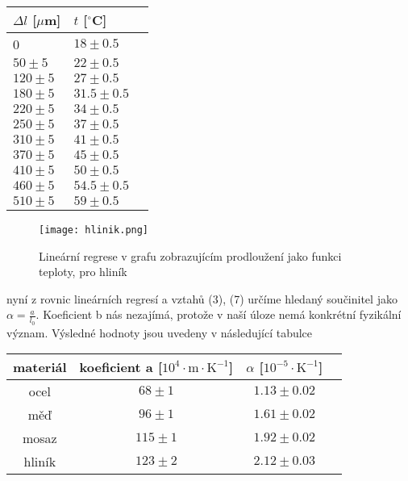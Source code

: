 \documentclass{article}
\begin{document}
\begin{center}
    \label{tab:title}
    \begin{tabular}{ | l | l  | p{4cm} |} \hline
    $\Delta l$ [$\mu$m] & $t$ [$^\circ$C] \\ \hline
    0 & $18\pm0.5$ \\ \hline
    $50\pm5$ & $22\pm0.5$ \\ \hline
    $120\pm5$ & $27\pm0.5$ \\ \hline
    $180\pm5$ & $31.5\pm0.5$ \\ \hline
    $220\pm5$ & $34\pm0.5$ \\ \hline
    $250\pm5$ & $37\pm0.5$ \\ \hline
    $310\pm5$ & $41\pm0.5$ \\ \hline
    $370\pm5$ & $45\pm0.5$ \\ \hline
    $410\pm5$ & $50\pm0.5$ \\ \hline
    $460\pm5$ & $54.5\pm0.5$ \\ \hline
    $510\pm5$ & $59\pm0.5$ \\ \hline
    \end{tabular}
\end{center}
\begin{figure}[H]
\centering
\texttt{[image: hlinik.png]}
\caption{Lineární regrese v grafu zobrazujícím prodloužení jako funkci teploty, pro hliník}
\end{figure}
nyní z rovnic lineárních regresí a vztahů (3), (7) určíme hledaný součinitel jako $\alpha = \frac{a}{l_{0}}$. Koeficient b nás nezajímá, protože v naší úloze nemá konkrétní fyzikální význam. Výsledné hodnoty jsou uvedeny v následující tabulce
\begin{center}
    \label{tab:title}
    \begin{tabular}{ | c | c | c  | m{4cm} |} \hline
    materiál & koeficient a [$\mathrm{10^{4} \cdot m \cdot K^{-1}}$] & $\alpha$ [$\mathrm{10^{-5} \cdot K^{-1}}$] \\ \hline
    ocel & $68\pm1$ & $1.13\pm0.02$ \\ \hline
    měď & $96\pm1$ & $1.61\pm0.02$ \\ \hline
    mosaz & $115\pm1$ & $1.92\pm0.02$ \\ \hline
    hliník & $123\pm2$ & $2.12\pm0.03$ \\ \hline
    \end{tabular}
\end{center}
\end{document}
